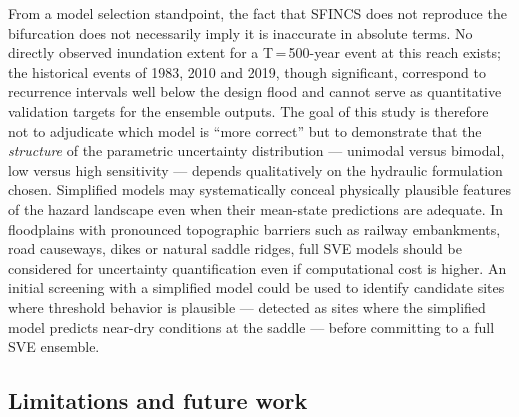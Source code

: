 \documentclass[review,12pt]{elsarticle}
\newcommand{\sfincs}{\textsc{SFINCS}}
\begin{document}
From a model selection standpoint, the fact that \sfincs{} does not reproduce
the bifurcation does not necessarily imply it is inaccurate in absolute
terms.
No directly observed inundation extent for a T\,=\,500-year event at this reach
exists; the historical events of 1983, 2010 and 2019, though significant,
correspond to recurrence intervals well below the design flood and cannot serve
as quantitative validation targets for the ensemble outputs.
The goal of this study is therefore not to adjudicate which model is
``more correct'' but to demonstrate that the \emph{structure} of the
parametric uncertainty distribution --- unimodal versus bimodal,
low versus high sensitivity --- depends qualitatively on the hydraulic
formulation chosen.
Simplified models may systematically conceal physically plausible features of
the hazard landscape even when their mean-state predictions are adequate.
In floodplains with pronounced topographic barriers such as railway
embankments, road causeways, dikes or natural saddle ridges, full SVE
models should be considered for uncertainty quantification even if
computational cost is higher.
An initial screening with a simplified model could be used to identify
candidate sites where threshold behavior is plausible --- detected as
sites where the simplified model predicts near-dry conditions at the
saddle --- before committing to a full SVE ensemble.

\subsection{Limitations and future work}
\label{sec:limitations}
\end{document}
